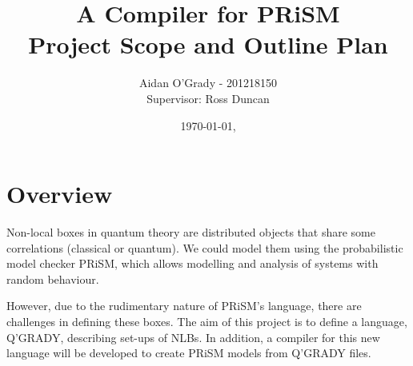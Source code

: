 \documentclass[11pt, a4paper]{article}
\begin{document}
\title{A Compiler for PRiSM \\
\large{Project Scope and Outline Plan}}
\author{Aidan O'Grady - 201218150\\Supervisor: Ross Duncan}
\date{\today, \currenttime}
\maketitle

\section{Overview} %
\label{sec:overview}
Non-local boxes in quantum theory are distributed objects that share some
correlations (classical or quantum). We could model them using the probabilistic
model checker PRiSM, which allows modelling and analysis of systems with random
behaviour.

However, due to the rudimentary nature of PRiSM's language, there are
challenges in defining these boxes. The aim of this project is to define a
language, Q'GRADY, describing set-ups of NLBs. In addition, a compiler for this
new language will be developed to create PRiSM models from Q'GRADY files.

\end{document}

